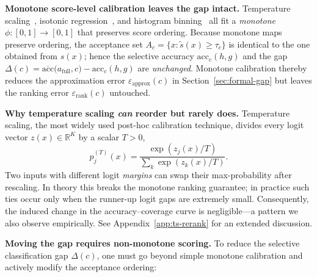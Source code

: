 \textbf{Monotone score-level calibration leaves the gap intact.}
Temperature scaling~\citep{guo2017calibration}, isotonic regression~\citep{zadrozny2002transforming}, and histogram
binning~\citep{zadrozny2001obtaining} all fit a \emph{monotone} \(\phi\colon[0,1]\to[0,1]\) that preserves score ordering.
Because monotone maps preserve ordering,
the acceptance set
\(A_c=\{x:\tilde s(x)\ge\tau_c\}\)
is identical to the one obtained from \(s(x)\);
hence the selective accuracy
\(\mathrm{acc}_c(h,g)\)
and the gap
\(
\Delta(c)=\overline{\mathrm{acc}}\bigl(a_{\text{full}},c\bigr)-\mathrm{acc}_c(h,g)
\)
are \emph{unchanged}.
Monotone calibration thereby reduces the approximation error \(\varepsilon_{\text{approx}}(c)\) in Section~\ref{sec:formal-gap} but leaves the ranking error \(\varepsilon_{\text{rank}}(c)\) untouched.

\textbf{Why temperature scaling \texorpdfstring{\emph{can}}{} reorder but rarely does.}
Temperature scaling, the most widely used post-hoc calibration technique, divides every logit vector
\(z(x)\in\mathbb{R}^K\) by a scalar \(T>0\),
\begin{equation}
p_j^{(T)}(x)=
\frac{\exp(z_j(x)/T)}{\sum_k \exp(z_k(x)/T)}.
\end{equation}
Two inputs with different logit \emph{margins} can swap their
max-probability after rescaling. In theory this breaks the monotone
ranking guarantee; in practice such ties occur only when the runner-up logit gaps are extremely small. Consequently, the induced change in the
accuracy–coverage curve is negligible—a pattern we also observe empirically. See Appendix~\ref{app:ts-rerank} for an extended discussion.

\textbf{Moving the gap requires non-monotone scoring.}
To reduce the selective classification gap \(\Delta(c)\), one must go beyond simple monotone calibration and actively modify the acceptance ordering:

